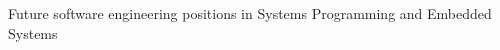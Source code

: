 

\begin{cvparagraph}


Future software engineering positions in Systems Programming and Embedded Systems

\end{cvparagraph}

